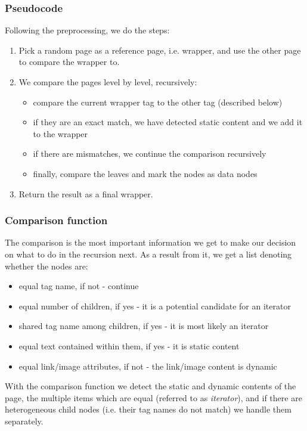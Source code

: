 \documentclass{article}
\begin{document}
	\subsubsection{Pseudocode} \label{v2-pseudo}
	Following the preprocessing, we do the  steps:
	\begin{enumerate}
		\item Pick a random page as a reference page, i.e. wrapper, and use the other page to compare the wrapper to.
		\item We compare the pages level by level, recursively:
		\begin{itemize}
			\item compare the current wrapper tag to the other tag (described below)
			\item if they are an exact match, we have detected static content and we add it to the wrapper
			\item if there are mismatches, we continue the comparison recursively
			\item finally, compare the leaves and mark the nodes as data nodes
		\end{itemize}
		\item Return the result as a final wrapper.
	\end{enumerate}
	
	\subsubsection{Comparison function}
	The comparison is the most important information we get to make our decision on what to do in the recursion next. As a result from it, we get a list denoting whether the nodes are:
	\begin{itemize}
		\item equal tag name, if not - continue
		\item equal number of children, if yes - it is a potential candidate for an iterator
		\item shared tag name among children, if yes - it is most likely an iterator
		\item equal text contained within them, if yes - it is static content
		\item equal link/image attributes, if not - the link/image content is dynamic
	\end{itemize}
	With the comparison function we detect the static and dynamic contents of the page, the multiple items which are equal (referred to as \textit{iterator}), and if there are heterogeneous child nodes (i.e. their tag names do not match) we handle them separately.
	
\end{document}
